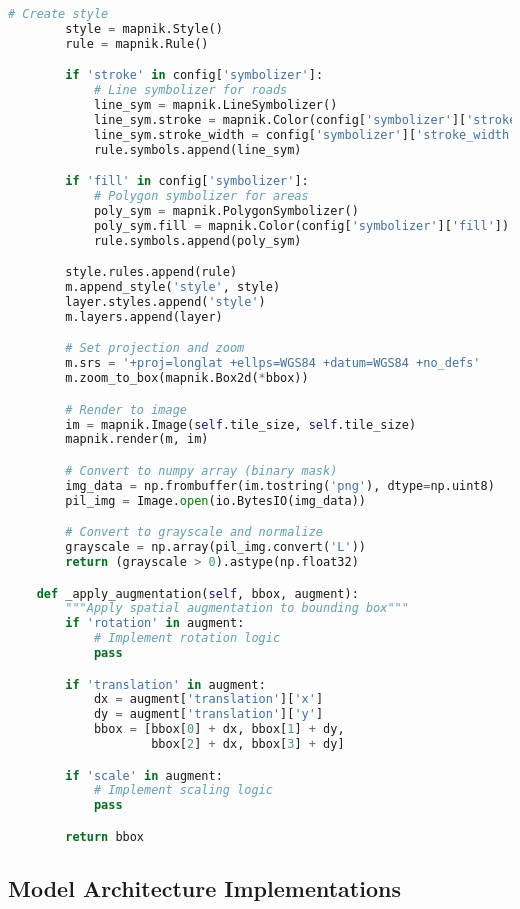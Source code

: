 \begin{lstlisting}[language=Python, caption=Comprehensive Rasterization System]
        # Create style
        style = mapnik.Style()
        rule = mapnik.Rule()

        if 'stroke' in config['symbolizer']:
            # Line symbolizer for roads
            line_sym = mapnik.LineSymbolizer()
            line_sym.stroke = mapnik.Color(config['symbolizer']['stroke'])
            line_sym.stroke_width = config['symbolizer']['stroke_width']
            rule.symbols.append(line_sym)

        if 'fill' in config['symbolizer']:
            # Polygon symbolizer for areas
            poly_sym = mapnik.PolygonSymbolizer()
            poly_sym.fill = mapnik.Color(config['symbolizer']['fill'])
            rule.symbols.append(poly_sym)

        style.rules.append(rule)
        m.append_style('style', style)
        layer.styles.append('style')
        m.layers.append(layer)

        # Set projection and zoom
        m.srs = '+proj=longlat +ellps=WGS84 +datum=WGS84 +no_defs'
        m.zoom_to_box(mapnik.Box2d(*bbox))

        # Render to image
        im = mapnik.Image(self.tile_size, self.tile_size)
        mapnik.render(m, im)

        # Convert to numpy array (binary mask)
        img_data = np.frombuffer(im.tostring('png'), dtype=np.uint8)
        pil_img = Image.open(io.BytesIO(img_data))

        # Convert to grayscale and normalize
        grayscale = np.array(pil_img.convert('L'))
        return (grayscale > 0).astype(np.float32)

    def _apply_augmentation(self, bbox, augment):
        """Apply spatial augmentation to bounding box"""
        if 'rotation' in augment:
            # Implement rotation logic
            pass

        if 'translation' in augment:
            dx = augment['translation']['x']
            dy = augment['translation']['y']
            bbox = [bbox[0] + dx, bbox[1] + dy,
                    bbox[2] + dx, bbox[3] + dy]

        if 'scale' in augment:
            # Implement scaling logic
            pass

        return bbox
\end{lstlisting}

\subsection{Model Architecture Implementations}

